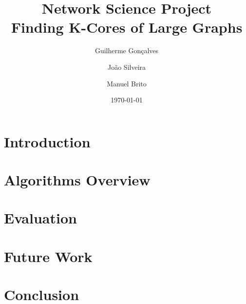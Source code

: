 \documentclass[a4paper, 11pt]{article}
\title{Network Science Project \\ \textbf{Finding K-Cores of Large Graphs}}
\author{Guilherme Gonçalves \and João Silveira \and Manuel Brito}
\date{\today}
\begin{document}
\maketitle

\clearpage
\tableofcontents
\clearpage

\section{Introduction}


\section{Algorithms Overview}


\section{Evaluation}


\section{Future Work}


\section{Conclusion}


\clearpage


\end{document}
